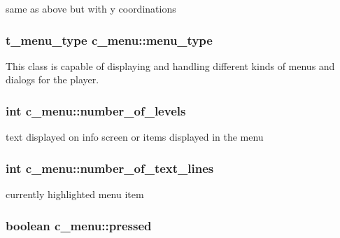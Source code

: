 same as above but with y coordinations \hypertarget{classc__menu_a1e0be6c7749c393b11b4a1f8330588f8}{
\subsubsection[{menu\-\_\-type}]{\setlength{\rightskip}{0pt plus 5cm}t\-\_\-menu\-\_\-type c\-\_\-menu\-::menu\-\_\-type\hspace{0.3cm}{\ttfamily [protected]}}}\label{classc__menu_a1e0be6c7749c393b11b4a1f8330588f8}
This class is capable of displaying and handling different kinds of menus and dialogs for the player. \hypertarget{classc__menu_a3fe87a5b76e64557af759a180b0bb0ae}{
\subsubsection[{number\-\_\-of\-\_\-levels}]{\setlength{\rightskip}{0pt plus 5cm}int c\-\_\-menu\-::number\-\_\-of\-\_\-levels\hspace{0.3cm}{\ttfamily [protected]}}}\label{classc__menu_a3fe87a5b76e64557af759a180b0bb0ae}
text displayed on info screen or items displayed in the menu \hypertarget{classc__menu_a4000a7ae156999a6e2ea273ab328a0f1}{
\subsubsection[{number\-\_\-of\-\_\-text\-\_\-lines}]{\setlength{\rightskip}{0pt plus 5cm}int c\-\_\-menu\-::number\-\_\-of\-\_\-text\-\_\-lines\hspace{0.3cm}{\ttfamily [protected]}}}\label{classc__menu_a4000a7ae156999a6e2ea273ab328a0f1}
currently highlighted menu item \hypertarget{classc__menu_a3181439816433cf8a2b42dcaf7fbfea7}{
\subsubsection[{pressed}]{\setlength{\rightskip}{0pt plus 5cm}boolean c\-\_\-menu\-::pressed\hspace{0.3cm}{\ttfamily [protected]}}}\label{classc__menu_a3181439816433cf8a2b42dcaf7fbfea7}
